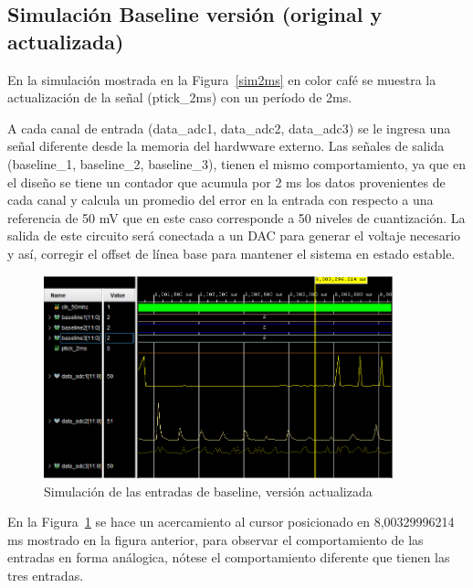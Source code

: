 \subsection{Simulación Baseline versión (original y actualizada)}
En la simulación mostrada en la Figura~\ref{sim2ms} en color café se muestra la actualización de la señal (ptick\_2ms) con un período de 2ms.

A cada canal de entrada (data\_adc1, data\_adc2, data\_adc3) se le ingresa una señal diferente desde la memoria del hardwware externo. Las señales de salida (baseline\_1, baseline\_2, baseline\_3), tienen el mismo comportamiento, ya que en el diseño se tiene un contador que acumula por 2 ms los datos provenientes de cada canal y calcula un promedio del error en la entrada con respecto a una referencia de 50 mV que en este caso corresponde a 50 niveles de cuantización. La salida de este circuito será conectada a un DAC para generar el voltaje necesario y así, corregir el offset de línea base para mantener el sistema en estado estable.  



\begin{figure}[H]
\includegraphics[width=0.9\textwidth]{Figs/zombasenue.PNG} 
\centering
\caption{Simulación de las entradas de baseline, versión actualizada}
\label{finbase}
\end{figure}

En la  Figura~\ref{finbase} se hace un acercamiento al cursor posicionado en 8,00329996214~ ms mostrado en la figura anterior, para observar el comportamiento de las entradas en forma análogica, nótese el  comportamiento diferente que tienen las tres entradas.



